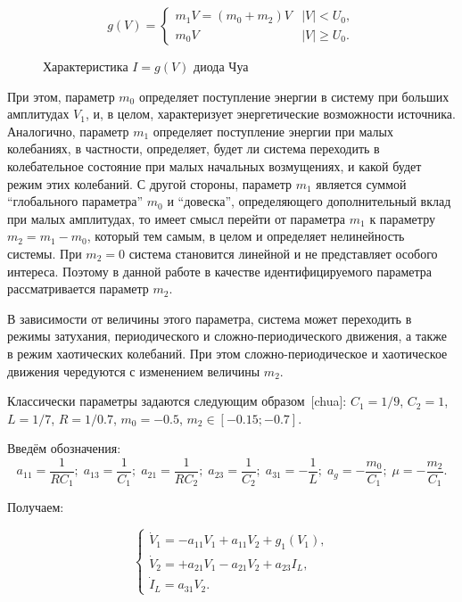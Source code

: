 \documentclass[a4paper,12pt]{article}
\begin{document}
\begin{equation}
g(V) =
\begin{cases}
  m_1 V = ( m_0 + m_2 ) V & |V| <   U_0, \\
  m_0 V                   & |V| \ge U_0.
\end{cases}
\label{atu:eq:diodchua}
\end{equation}

\begin{figure}[htb!]
\begin{center}

\end{center}
\caption{Характеристика \(I=g(V)\) диода Чуа}
\label{atu:f:diodchua}
\end{figure}


При этом, параметр \(m_0\) определяет поступление энергии в систему
при больших амплитудах \(V_1\), и, в целом, характеризует
энергетические возможности источника.
Аналогично, параметр \(m_1\) определяет поступление энергии
при малых колебаниях, в частности, определяет, будет ли
система переходить в колебательное состояние при малых начальных
возмущениях, и какой будет режим этих колебаний.
С другой стороны, параметр \(m_1\) является суммой
``глобального параметра'' \(m_0\) и ``довеска'',
определяющего дополнительный вклад при малых амплитудах,
то имеет смысл перейти от параметра \(m_1\) к параметру
\( m_2 = m_1 - m_0 \), который тем самым, в целом
и определяет нелинейность
системы. При \( m_2 = 0 \) система становится линейной
и не представляет особого интереса. Поэтому
в данной работе в качестве
идентифицируемого параметра рассматривается параметр \(m_2\).

В зависимости от величины этого параметра,
система может переходить в режимы затухания,
периодического и сложно-периодического движения, а также в режим
хаотических колебаний. При этом сложно-периодическое и хаотическое
движения чередуются с изменением величины \(m_2\).


Классически параметры задаются следующим образом~[chua]:
$C_1 = 1/9$, $C_2 = 1$, $L= 1/7$, $R = 1/0.7$, $m_0=-0.5$, $ m_2 \in [ -0.15; -0.7 ] $.

Введём обозначения:
\[
  a_{11} = \frac{1}{R C_1}; \;
  a_{13} = \frac{1}{C_1}; \;
  a_{21} = \frac{1}{R C_2}; \;
  a_{23} = \frac{1}{C_2}; \;
  a_{31} = -\frac{1}{L}; \;
  a_g = - \frac{m_0}{C_1}; \;
  \mu = - \frac{m_2}{C_1}.
\]

\noindent
Получаем:

\begin{equation}
\begin{cases}
  \dot{V}_1  = -a_{11} V_1 + a_{11}  V_2  + g_1(V_1) , \\
  \dot{V}_2  = +a_{21} V_1 - a_{21}  V_2  + a_{23} I_L    , \\
  \dot{I}_L  =  a_{31} V_2.
\end{cases}
\label{atu:eq:chua2}
\end{equation}
\end{document}
